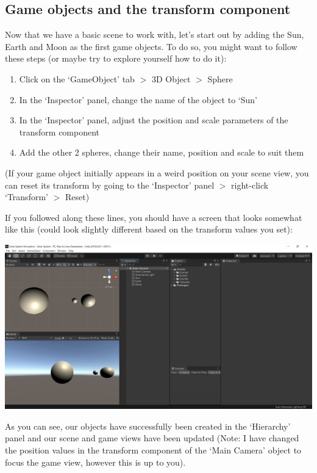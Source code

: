 \documentclass{article}[a4paper,12pt]
\theoremstyle{definition}
\begin{document}
\subsection{Game objects and the transform component}

Now that we have a basic scene to work with, let's start out by adding the Sun, Earth and Moon as the first game objects. To do so, you might want to follow these steps (or maybe try to explore yourself how to do it):
\begin{enumerate}
	\item Click on the `GameObject' tab $>$ 3D Object $>$ Sphere
	\item In the `Inspector' panel, change the name of the object to `Sun'
	\item In the `Inspector' panel, adjust the position and scale parameters of the transform component
	\item Add the other 2 spheres, change their name, position and scale to suit them
\end{enumerate}
(If your game object initially appears in a weird position on your scene view, you can reset its transform by going to the `Inspector' panel $>$ right-click `Transform' $>$ Reset)
\vspace{6pt}

If you followed along these lines, you should have a screen that looks somewhat like this (could look slightly different based on the transform values you set):
\begin{center}\includegraphics[width=\textwidth]{add_sun_earth_moon.png}\end{center}
As you can see, our objects have successfully been created in the `Hierarchy' panel and our scene and game views have been updated (Note: I have changed the position values in the transform component of the `Main Camera' object to focus the game view, however this is up to you).
\end{document}
